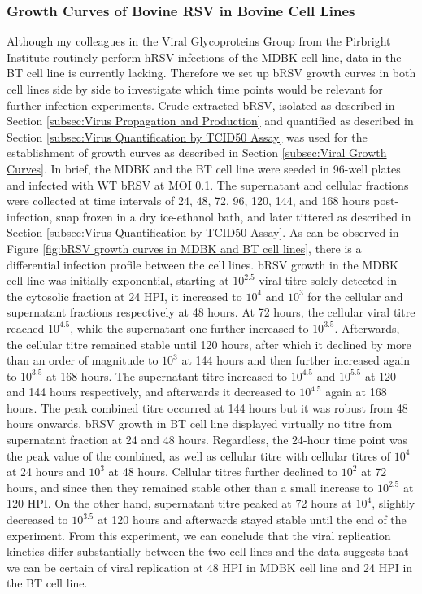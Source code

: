 \subsubsection{Growth Curves of Bovine RSV in Bovine Cell Lines} \label{Growth Curves of Bovine RSV in Bovine Cell Lines}
Although my colleagues in the Viral Glycoproteins Group from the Pirbright Institute routinely perform hRSV infections of the MDBK cell line, data in the BT cell line is currently lacking. Therefore we set up bRSV growth curves in both cell lines side by side to investigate which time points would be relevant for further infection experiments. Crude-extracted bRSV, isolated as described in Section \ref{subsec:Virus Propagation and Production} and quantified as described in Section \ref{subsec:Virus Quantification by TCID50 Assay} was used for the establishment of growth curves as described in Section \ref{subsec:Viral Growth Curves}. In brief, the MDBK and the BT cell line were seeded in 96-well plates and infected with WT bRSV at MOI 0.1. The supernatant and cellular fractions were collected at time intervals of 24, 48, 72, 96, 120, 144, and 168 hours post-infection, snap frozen in a dry ice-ethanol bath, and later tittered as described in Section \ref{subsec:Virus Quantification by TCID50 Assay}. As can be observed in Figure \ref{fig:bRSV growth curves in MDBK and BT cell lines}, there is a differential infection profile between the cell lines. bRSV growth in the MDBK cell line was initially exponential, starting at \(10^{2.5}\) viral titre solely detected in the cytosolic fraction at 24 HPI, it increased to \(10^{4}\) and \(10^{3}\) for the cellular and supernatant fractions respectively at 48 hours. At 72 hours, the cellular viral titre reached \(10^{4.5}\), while the supernatant one further increased to \(10^{3.5}\). Afterwards, the cellular titre remained stable until 120 hours, after which it declined by more than an order of magnitude to \(10^{3}\) at 144 hours and then further increased again to \(10^{3.5}\) at 168 hours. The supernatant titre increased to \(10^{4.5}\) and \(10^{5.5}\) at 120 and 144 hours respectively, and afterwards it decreased to \(10^{4.5}\) again at 168 hours. The peak combined titre occurred at 144 hours but it was robust from 48 hours onwards. bRSV growth in BT cell line displayed virtually no titre from supernatant fraction at 24 and 48 hours. Regardless, the 24-hour time point was the peak value of the combined, as well as cellular titre with cellular titres of \(10^{4}\) at 24 hours and \(10^{3}\) at 48 hours. Cellular titres further declined to \(10^{2}\) at 72 hours, and since then they remained stable other than a small increase to \(10^{2.5}\) at 120 HPI. On the other hand, supernatant titre peaked at 72 hours at \(10^{4}\), slightly decreased to \(10^{3.5}\) at 120 hours and afterwards stayed stable until the end of the experiment. From this experiment, we can conclude that the viral replication kinetics differ substantially between the two cell lines and the data suggests that we can be certain of viral replication at 48 HPI in MDBK cell line and 24 HPI in the BT cell line.


